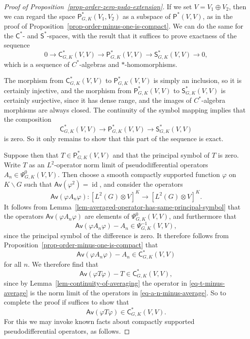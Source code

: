\documentclass[leqno,11pt]{amsart}
\numberwithin{equation}{subsection}
\theoremstyle{plain}
\theoremstyle{definition}
\theoremstyle{remark}
\newcommand{\PSDO}{\mathsf{P}}
\newcommand{\CC}{\mathsf{C}}
\newcommand{\Symb}{\mathsf{S}}
\begin{document}
\begin{proof}[Proof of Proposition~\ref{prop-order-zero-psdo-extension}]
If we set $V = V_1\oplus V_2$, then we can regard the space $\PSDO^*_{G,K}(V_1,V_2)$ as a subspace of $\PSDO^*(V,V)$, as in the proof of Proposition~\ref{prop-order-minus-one-is-compact}. 
We can do the same for the $\CC^*$- and $\Symb^*$-spaces, with the result that it suffices to prove exactness of the sequence 
\[
    0 \longrightarrow \CC^*_{G,K}(V,V) \longrightarrow \PSDO^*_{G,K}(V,V) \longrightarrow \Symb_{G,K}^* (V,V)  \longrightarrow 0 ,
\]
which is a sequence of $C^*$-algebras and $*$-homomorphisms.

The morphism from $\CC^*_{G,K}(V,V)$ to $\PSDO^*_{G,K}(V,V)$ is simply an inclusion, so it is certainly injective, and the morphism from $\PSDO^*_{G,K}(V,V)$  to $\Symb_{G,K}^*(V,V)$ is certainly surjective, since it has dense range, and the images of $C^*$-algebra morphisms are always closed. The continuity of the symbol mapping implies that the composition
\[
\CC^*_{G,K}(V,V) \longrightarrow \PSDO^*_{G,K}(V,V) \longrightarrow \Symb_{G,K}^* (V,V) 
\]
is zero.  So it only remains to show that this part of the sequence is exact. 

Suppose then that $T\in \PSDO^*_{G,K}(V,V)$ and that the principal symbol of $T$ is zero.  Write $T$ as an $L^2$-operator norm limit of pseudodifferential operators $A_n\in \Psi^0_{G,K}(V,V)$.  Then choose a smooth compactly supported function $\varphi$ on $K \backslash G$ such that $\mathsf{Av}(\varphi^2) = \operatorname{id}$,  and consider the operators 
\[
\mathsf{Av}(\varphi A_n \varphi) \colon [L^2  (G)\otimes   V]^K  \longrightarrow  [L^2  (G)\otimes   V]^K  .
\]
It follows from Lemma~\ref{lem-averaged-operator-has-same-principal-symbol} that the operators $\mathsf{Av}(\varphi A_n \varphi)$ are elements of $\Psi^0_{G,K}(V,V)$, and furthermore that 
\[
\mathsf{Av}(\varphi A_n\varphi) - A_n \in \Psi^{-1}_{G,K}(V,V),
\]
since the  principal symbol of the difference is zero.  It therefore follows from  Proposition~\ref{prop-order-minus-one-is-compact} that 
\begin{equation}
\label{eq-a-n-minus-average}
\mathsf{Av}(\varphi A_n\varphi) - A_n  \in \CC^*_{G,K}(V,V) 
\end{equation}
for all $n$.  We therefore find  that 
\begin{equation}
\label{eq-t-minus-average}
\mathsf{Av}(\varphi T\varphi) - T  \in \CC^*_{G,K}(V,V) ,
\end{equation}
since by Lemma~\ref{lem-continuity-of-averaging} the operator in  \eqref{eq-t-minus-average} is the norm limit of the  operators in \eqref{eq-a-n-minus-average}.  So to complete the proof if suffices to show that 
\begin{equation}
\label{eq-averaged-operator-in-c-star}
\mathsf{Av}(\varphi T \varphi)\in \CC^*_{G,K}(V,V).
\end{equation}
For this we may invoke  known facts about compactly supported pseudodifferential operators, as follows.


\end{proof}
\end{document}
